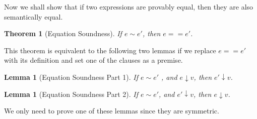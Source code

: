\documentclass[a4paper]{article}
\newtheorem{thm}[equation]{Theorem}
\newtheorem{lem}[equation]{Lemma}
\theoremstyle{plain}
\def\DA{\downarrow}
\begin{document}
Now we shall show that if two expressions are provably equal, then they are also semantically equal.

\begin{thm}[Equation Soundness]
	If $e \sim e'$, then $e == e'$.
\label{thm:EqSound}
\end{thm}

This theorem is equivalent to the following two lemmas if we replace $e == e'$ with its definition and set one of the clauses as a premise.

\begin{lem}[Equation Soundness Part 1]
	If $e\sim e'$ , and $e\DA v$, then $e' \DA v$.
\end{lem}

\begin{lem}[Equation Soundness Part 2]
	If $e\sim e'$, and $e'\DA v$, then $e \DA v$.
\end{lem}

We only need to prove one of these lemmas since they are symmetric.
\end{document}
